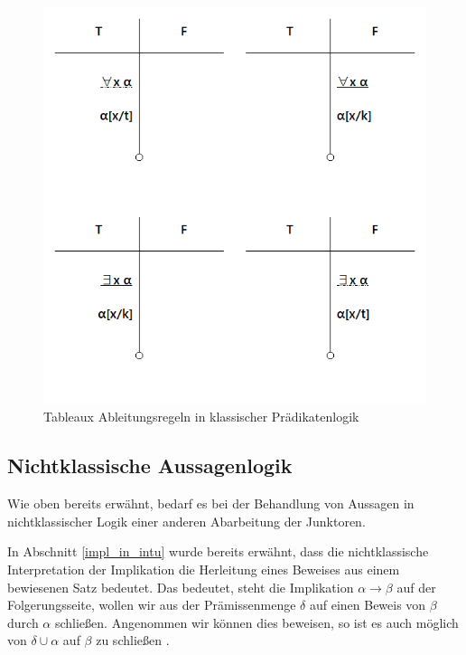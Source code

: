 \begin{figure}[h]
\begin{center}
\includegraphics[scale=0.7]{images/Tableaux_Rules_Pred_Logic.png}
\caption{Tableaux Ableitungsregeln in klassischer Prädikatenlogik}
\label{tableaux_class_pred_all_rules}
\end{center}
\end{figure}

\subsection{\label{tableaux_impl_descr}Nichtklassische Aussagenlogik}
Wie oben bereits erwähnt, bedarf es bei der Behandlung von Aussagen in nichtklassischer Logik einer anderen Abarbeitung der Junktoren.

In Abschnitt \ref{impl_in_intu} wurde bereits erwähnt, dass die nichtklassische Interpretation der Implikation die Herleitung eines Beweises aus einem bewiesenen Satz bedeutet. Das bedeutet, steht die Implikation $\alpha\rightarrow\beta$ auf der Folgerungsseite, wollen wir aus der Prämissenmenge $\delta$ auf einen Beweis von $\beta$ durch $\alpha$ schließen. Angenommen wir können dies beweisen, so ist es auch möglich von $\delta\cup\alpha$ auf $\beta$ zu schließen \cite{B62}.

